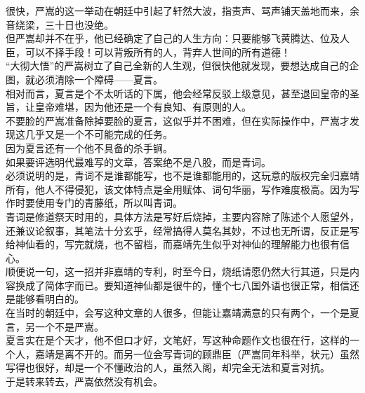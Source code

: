 \begin{multicols}{\theparacolNo}
很快，严嵩的这一举动在朝廷中引起了轩然大波，指责声、骂声铺天盖地而来，余音绕梁，三十日也没绝。\\

但严嵩却并不在乎，他已经确定了自己的人生方向：只要能够飞黄腾达、位及人臣，可以不择手段！可以背叛所有的人，背弃人世间的所有道德！\\

“大彻大悟”的严嵩树立了自己全新的人生观，但很快他就发现，要想达成自己的企图，就必须清除一个障碍——夏言。\\

相对而言，夏言是个不太听话的下属，他会经常反驳上级意见，甚至退回皇帝的圣旨，让皇帝难堪，因为他还是一个有良知、有原则的人。\\

不要脸的严嵩准备除掉要脸的夏言，这似乎并不困难，但在实际操作中，严嵩才发现这几乎又是一个不可能完成的任务。\\

因为夏言还有一个他不具备的杀手锏。\\

如果要评选明代最难写的文章，答案绝不是八股，而是青词。\\

必须说明的是，青词不是谁都能写，也不是谁都能用的，这玩意的版权完全归嘉靖所有，他人不得侵犯，该文体特点是全用赋体、词句华丽，写作难度极高。因为写作时要使用专门的青藤纸，所以叫青词。\\

青词是修道祭天时用的，具体方法是写好后烧掉，主要内容除了陈述个人愿望外，还兼议论叙事，其笔法十分玄乎，经常搞得人莫名其妙，不过也无所谓，反正是写给神仙看的，写完就烧，也不留档，而嘉靖先生似乎对神仙的理解能力也很有信心。\\

顺便说一句，这一招并非嘉靖的专利，时至今日，烧纸请愿仍然大行其道，只是内容换成了简体字而已。要知道神仙都是很牛的，懂个七八国外语也很正常，相信还是能够看明白的。\\

在当时的朝廷中，会写这种文章的人很多，但能让嘉靖满意的只有两个，一个是夏言，另一个不是严嵩。\\

夏言实在是个天才，他不但口才好，文笔好，写这种命题作文也很在行，这样的一个人，嘉靖是离不开的。而另一位会写青词的顾鼎臣（严嵩同年科举，状元）虽然写得也很好，却是一个不懂政治的人，虽然入阁，却完全无法和夏言对抗。\\

于是转来转去，严嵩依然没有机会。\\


\end{multicols}
